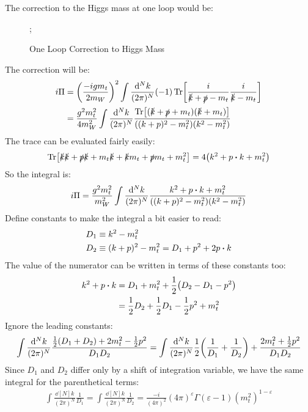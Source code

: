 \documentclass[12pt]{article}
\newcommand{\sla}[1]{\slashed{#1}}
\renewcommand{\sp}{\slashed{p}}
\newcommand{\veps}{\varepsilon}
\begin{document}
The correction to the Higgs mass at one loop would be:
\begin{figure}[H]
  \centering
  ;
  \caption{One Loop Correction to Higgs Mass}
  \label{fig:3}
\end{figure}
The correction will be:
\begin{align*}
  i\Pi&=\qty(\frac{-igm_t}{2m_W})^2\int\frac{\dd[N]{k}}{(2\pi)^N}(-1)
  \Tr[\frac{i}{\sla{k}+\sp-m_t}\frac{i}{\sla{k}-m_t}]\\
  &=\frac{g^2m_t^2}{4m_W^2}\int\frac{\dd[N]{k}}{(2\pi)^N}
  \frac{\Tr[(\sla{k}+\sp+m_t)(\sla{k}+m_t)]}{((k+p)^2-m_t^2)(k^2-m_t^2)}
\end{align*}
The trace can be evaluated fairly easily:
\begin{align*}
  \Tr[\sla{k}\sla{k}+\sp\sla{k}+m_t\sla{k}+\sla{k}m_t+\sp m_t+m_t^2]=
  4\qty(k^2+p\vdot k+m_t^2)
\end{align*}
So the integral is:
\begin{align*}
  i\Pi=\frac{g^2m_t^2}{m_W^2}\int\frac{\dd[N]{k}}{(2\pi)^N}
  \frac{k^2+p\vdot k+m_t^2}{((k+p)^2-m_t^2)(k^2-m_t^2)}
\end{align*}
Define constants to make the integral a bit easier to read:
\begin{align*}
  D_1&\equiv k^2-m_t^2\\
  D_2&\equiv (k+p)^2-m_t^2=D_1+p^2+2p\vdot k
\end{align*}
The value of the numerator can be written in terms of these constants too:
\begin{align*}
  k^2+p\vdot k&=D_1+m_t^2+\frac12\qty(D_2-D_1-p^2)\\
  &=\frac12D_2+\frac12D_1-\frac12p^2+m_t^2
\end{align*}
Ignore the leading constants:
\begin{align*}
  \int\frac{\dd[N]{k}}{(2\pi)^N}\frac{\frac12(D_1+D_2)+2m_t^2-\frac12p^2}{D_1D_2}
  =\int\frac{\dd[N]{k}}{(2\pi)^N}\frac12\qty(\frac1{D_1}+\frac1{D_2})+
  \frac{2m_t^2+\frac12p^2}{D_1D_2}
\end{align*}
Since $D_1$ and $D_2$ differ only by a shift of integration variable, we have the same integral for the parenthetical terms:
\begin{align*}
  \int\frac{\dd[N]{k}}{(2\pi)^N}\frac1{D_1}=
  \int\frac{\dd[N]{k}}{(2\pi)^N}\frac1{D_2}=
  \frac{-i}{(4\pi)^2}(4\pi)^\veps\Gamma(\veps-1)(m_t^2)^{1-\veps}
\end{align*}
\end{document}
